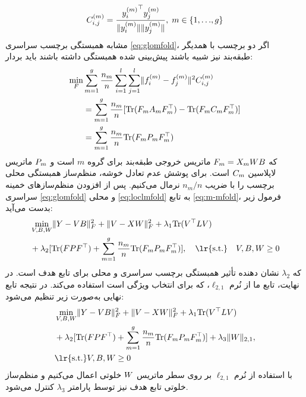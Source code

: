 \begin{align}\label{eq:llc}	
	{{{C}^{(m)}_{i,j}}=
		\frac
		{{\boldmath{y}^{(m)}_{i}}^\top\boldmath{y}^{(m)}_{j}}
		{{\lVert{\boldmath{y}^{(m)}_{i}}\lVert}\lVert{\boldmath{y}^{(m)}_{j}}\lVert}}, \; m \in  \{1,{\dots},{g}\}
\end{align}
مشابه همبستگی برچسب سراسری \eqref{eq:glomfold}، اگر دو برچسب با همدیگر همبستگی داشته باشند باید بردار ‎‎پیش‌بینی شده‎ طبقه‌بند نیز شبیه باشند:
\begin{align}\label{eq:loclmfold}
	\min_{\boldmath{F}}&\sum_{m=1}^{g}\frac{n_m}{n}\sum_{i=1}^{l}\sum_{j=1}^{l} \lVert{\boldmath{f}^{(m)}_i}-{\boldmath{f}^{(m)}_j}\rVert^2 {C^{(m)}_{i,j}}\nonumber \\
	&=\sum_{m=1}^{g} \frac{n_m}{n}[\mathrm{Tr}(\boldmath{F}_m\boldmath{A}_m\boldmath{F}_m^\top) - \mathrm{Tr}(\boldmath{F}_m \boldmath{C}_m \boldmath{F}_m^\top)]\nonumber \\
	&= \sum_{m=1}^{g}\frac{n_m}{n}\mathrm{Tr}(\boldmath{F}_m \boldmath{P}_m \boldmath{F}_m^\top)
\end{align}
که $\boldmath{F}_m = \boldmath{X}_m\boldmath{WB}$ ماتریس خروجی طبقه‌بند برای گروه $m$ است و $\boldmath{P}_m$ ماتریس لاپلاسین $\boldmath{C}_m$ است. برای پوشش عدم تعادل خوشه، منظم‌ساز همبستگی محلی برچسب را با ضریب ${n_m}/{n}$  نرمال می‌کنیم.
پس از افزودن منظم‌سازهای خمینه سراسری \eqref{eq:glomfold} و محلی  \eqref{eq:loclmfold} به تابع \eqref{eq:m-mfold}، فرمول زیر بدست می‌آید:
\begin{align}
	&\min_{\boldmath{V},\boldmath{B},\boldmath{W}}\lVert\boldmath{Y}-\boldmath{V}\boldmath{B}\rVert^2_F+\lVert\boldmath{V}-\boldmath{X}\boldmath{W}\rVert^2_F+\lambda_1{\mathrm{Tr}\boldmath{({V}^\top{LV})}}
	\nonumber \\&+\lambda_2[\mathrm{Tr}(\boldmath{FP}\boldmath{F}^\top) 
	+ \sum_{m=1}^{g}\frac{n_m}{n}\mathrm{Tr}(\boldmath{F}_m\boldmath{P}_m\boldmath{F}^\top_m) ],
	\quad{\text{\lr{s.t.}}\quad}\boldmath{V},\boldmath{B},\boldmath{W}\geq 0 
\end{align}
که $\lambda_2$ نشان دهنده تأثیر همبستگی برچسب سراسری و محلی برای تابع هدف است. در نهایت، تابع ما از نُرم $\ell_{2,1} $، که برای انتخاب ویژگی است استفاده می‌کند. در نتیجه تابع نهایی به‌صورت زیر تنظیم می‌شود: 
\begin{align}\label{eq:BeOpt}
	&\min_{\boldmath{V},\boldmath{B},\boldmath{W}}\lVert\boldmath{Y}-\boldmath{V}\boldmath{B}\rVert^2_F+\lVert\boldmath{V}-\boldmath{X}\boldmath{W}\rVert^2_F+\lambda_1{\mathrm{Tr}\boldmath{({V}^\top{LV})}} \nonumber \\ 
	& +\lambda_2[\mathrm{Tr}(\boldmath{FP}\boldmath{F}^\top)+\sum_{m=1}^{g}\frac{n_m}{n}\mathrm{Tr}(\boldmath{F}_m\boldmath{P}_m\boldmath{F}^\top_m) ]+ \lambda_3\lVert\boldmath{W}\rVert_{2,1},\nonumber \\ &{\text{\lr{s.t.}}}\boldmath{V},\boldmath{B},\boldmath{W}\geq 0 \nonumber \\
\end{align}
با استفاده از نُرم $\ell_{2,1} $ بر روی سطر ماتریس $\boldmath{W}$ خلوتی اعمال می‌کنیم و منظم‌ساز خلوتی تابع هدف نیز توسط پارامتر $\lambda_3$ کنترل می‌شود.

